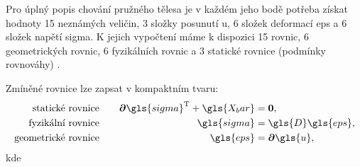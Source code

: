 Pro úplný popis chování pružného tělesa je v každém jeho bodě potřeba získat hodnoty 15 neznámých veličin, 3 složky posunutí \gls{u}, 6 složek deformací \gls{eps} a 6 složek napětí \gls{sigma}. K jejich vypočtení máme k dispozici 15 rovnic, 6 geometrických rovnic, 6 fyzikálních rovnic a 3 statické rovnice (podmínky rovnováhy) \cite[8]{teorie_pruznosti}.

Zmíněné rovnice lze zapsat v kompaktním tvaru:
\begin{alignat}{2}
    \text{statické~rovnice} \quad && \boldsymbol\partial \gls{sigma}^\mathrm{T} + \gls{X_bar} &= \matr{0}, \label{eq:equilibrium_equations}\\
    \text{fyzikální~rovnice} \quad && \gls{sigma} &= \gls{D} \gls{eps}, \label{eq:constitutive_equations}\\
    \text{geometrické~rovnice} \quad && \gls{eps} &= \boldsymbol\partial{\gls{u}} \label{eq:kinematic_equations},
\end{alignat}
kde
